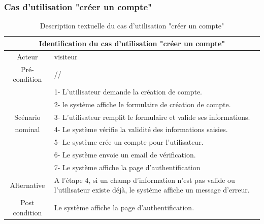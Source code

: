 \documentclass[edit,12pt,a4paper,ChapStyle,oneside,doubleinterligne]{report}
\begin{document}
\subsubsection{Cas d'utilisation "créer un compte"}
\begin{table}[h!]
    \centering
    \begin{tabular}{|c|m{10cm}|}
    \hline
         \multicolumn{2}{|c|}{Identification du cas d'utilisation "créer un compte" }\\
         \hline
         Acteur & visiteur\\
         \hline
         Pré-condition & // \\
         \hline
          & 1- L’utilisateur demande la création de compte.\\
          & 2- le système affiche le formulaire de création de compte. \\
         Scénario & 3- L’utilisateur remplit le formulaire et valide ses informations.  \\
         nominal& 4- Le système vérifie la validité des informations saisies.\\
          & 5- Le système crée un compte pour l’utilisateur.\\
          & 6- Le système envoie un email de vérification. \\
          & 7- Le système affiche la page d’authentification \\
         \hline
         Alternative  & A l’étape 4, si un champ d’information n’est pas valide ou
         l’utilisateur existe déjà, le système affiche un message d’erreur.\\
         \hline
         Post condition& Le système affiche la page d’authentification.  \\
         \hline
    \end{tabular}
    \caption{Description textuelle du cas d'utilisation "créer un compte" }
    \label{tab:cas1}
\end{table}
\end{document}
